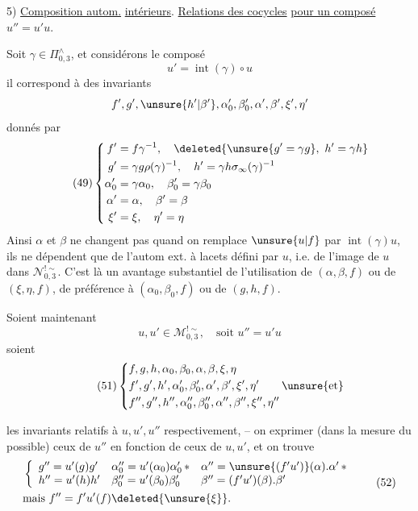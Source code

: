 
5) \uline{Composition  autom.} \uline{intérieurs}. \uline{Relations des cocycles} \uline{pour un composé} $u''=u'u$.

Soit $\gamma\in\Pi_{0,3}^{\wedge}$, et considérons le composé
\[
\tag{48}
u'=\operatorname{int}(\gamma)\circ u
\]
il correspond à des invariants
\[
f',g',\unsure{h'|\beta'},\alpha_0',\beta_0',\alpha',\beta',\xi',\eta'
\]
donnés par
\[
\tag{49}
\left\{\begin{aligned}
f'&=f\gamma^{-1},\quad\deleted{\unsure{g'=\gamma g},\ h'=\gamma h}\\
g'&=\gamma g\rho(\gamma)^{-1},\quad h'=\gamma h\sigma_\infty(\gamma)^{-1}\\
\alpha_0'&=\gamma\alpha_0,\quad\beta_0'=\gamma\beta_0\\
\alpha'&=\alpha,\quad\beta'=\beta\\
\xi'&=\xi,\quad\eta'=\eta
\end{aligned}\right.
\]
Ainsi $\alpha$ et $\beta$ ne changent pas quand on remplace $\unsure{u|f}$ par $\operatorname{int}(\gamma)u$, ils ne dépendent que de l'autom ext. à lacets défini par $u$, i.e. de l'image de $u$ dans $\mathcal{N}_{0,3}^{!\sim}$. C'est là un avantage substantiel de l'utilisation de $(\alpha,\beta,f)$ ou de $(\xi,\eta,f)$, de préférence à $(\alpha_0,\beta_0,f)$ ou de $(g,h,f)$.

Soient maintenant
\[
\tag{50}
u,u'\in\mathcal{M}_{0,3}^{!\sim},\quad\text{soit }u''=u'u
\]
soient
\[
\tag{51}
\left\{\begin{aligned}
&f,g,h,\alpha_0,\beta_0,\alpha,\beta,\xi,\eta\\
&f',g',h',\alpha_0',\beta_0',\alpha',\beta',\xi',\eta'\qquad\unsure{\text{et}}\\
&f'',g'',h'',\alpha_0'',\beta_0'',\alpha'',\beta'',\xi'',\eta''
\end{aligned}\right.
\]


les invariants relatifs à $u,u',u''$ respectivement, -- on  exprimer (dans la mesure du possible) ceux de $u''$ en fonction de ceux de $u,u'$, et on trouve
\[
\begin{aligned}
&\left\{\begin{array}{lll}
g''=u'(g)g' & \alpha_0''=u'(\alpha_0)\alpha_0'\, {*} & \alpha''=\unsure{(f'u')}(\alpha).\alpha'\, {*}\\
h''=u'(h)h' & \beta_0''=u'(\beta_0)\beta_0' & \beta''=(f'u')(\beta).\beta'
\end{array}\right.\\
&\text{mais } f''=f'u'(f)\deleted{\unsure{\xi}}.
\end{aligned}
\tag{52}
\]

